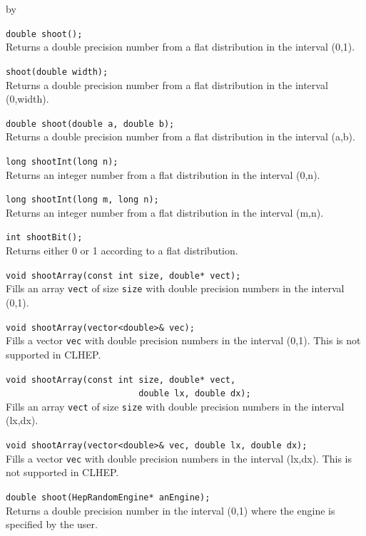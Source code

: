 \documentclass[twoside]{article}
\newcommand{\comp}[1]{\texttt{#1}}%
\newcommand{\entrylabel}[1]{\mbox{\textbf{{#1}}}\hfil}%
\newenvironment{entry}
{\begin{list}{}%
    {\renewcommand{\makelabel}{\entrylabel}%
     \setlength{\labelwidth}{90pt}%
     \setlength{\leftmargin}{\labelwidth}
     \advance\leftmargin by \labelsep%
      }%
    }%
  {\end{list}}
\newcommand{\Entrylabel}[1]%
{\raisebox{0pt}[1ex][0pt]{\makebox[\labelwidth][l]%
    {\parbox[t]{\labelwidth}{\hspace{0pt}\textbf{{#1}}}}}}
\newenvironment{Entry}%
{\renewcommand{\entrylabel}{\Entrylabel}\begin{entry}}%
  {\end{entry}}
\begin{document}
\begin{description}
\begin{Entry}
    \verb+double shoot();+\\
    Returns a double precision number from a flat distribution
    in the interval (0,1).
    
    \verb+shoot(double width);+\\
    Returns a double precision number from a flat distribution
    in the interval (0,width).
    
    \verb+double shoot(double a, double b);+\\
    Returns a double precision number from a flat distribution
    in the interval (a,b).

    \verb+long shootInt(long n);+\\
    Returns an integer number from a flat distribution
    in the interval (0,n).
    
    \verb+long shootInt(long m, long n);+\\
    Returns an integer number from a flat distribution
    in the interval (m,n).
    
    \verb+int shootBit();+\\
    Returns either 0 or 1 according to a flat distribution.
    
    \verb+void shootArray(const int size, double* vect);+\\
    Fills an array \comp{vect} of size \comp{size} with double
    precision numbers in the interval (0,1).

    \verb+void shootArray(vector<double>& vec);+\\
    Fills a vector \comp{vec} with double
    precision numbers in the interval (0,1).
    This is not supported in CLHEP.

    \verb+void shootArray(const int size, double* vect,+\\
    \verb+                          double lx, double dx);+\\
    Fills an array \comp{vect} of size \comp{size} with double
    precision numbers in the interval (lx,dx).

    \verb+void shootArray(vector<double>& vec, double lx, double dx);+\\
    Fills a vector \comp{vec} with double
    precision numbers in the interval (lx,dx).
    This is not supported in CLHEP.
    
    \verb+double shoot(HepRandomEngine* anEngine);+\\
    Returns a double precision number in the interval (0,1)
    where the engine is specified by the user.
    

\end{Entry}
\end{description}
\end{document}
